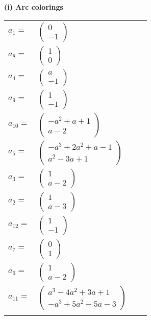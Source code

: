 \documentclass[1p]{elsarticle_modified}
\theoremstyle{definition}
\begin{document}
\flushleft \textbf{(i) Arc colorings}\\
\begin{tabular}{m{7pt} m{180pt} m{7pt} m{180pt} }
\flushright $a_{1}=$&$\begin{pmatrix}0\\-1\end{pmatrix}$ \\
\flushright $a_{8}=$&$\begin{pmatrix}1\\0\end{pmatrix}$ \\
\flushright $a_{4}=$&$\begin{pmatrix}a\\-1\end{pmatrix}$ \\
\flushright $a_{9}=$&$\begin{pmatrix}1\\-1\end{pmatrix}$ \\
\flushright $a_{10}=$&$\begin{pmatrix}- a^2+a+1\\a-2\end{pmatrix}$ \\
\flushright $a_{5}=$&$\begin{pmatrix}- a^3+2 a^2+a-1\\a^2-3 a+1\end{pmatrix}$ \\
\flushright $a_{3}=$&$\begin{pmatrix}1\\a-2\end{pmatrix}$ \\
\flushright $a_{2}=$&$\begin{pmatrix}1\\a-3\end{pmatrix}$ \\
\flushright $a_{12}=$&$\begin{pmatrix}1\\-1\end{pmatrix}$ \\
\flushright $a_{7}=$&$\begin{pmatrix}0\\1\end{pmatrix}$ \\
\flushright $a_{6}=$&$\begin{pmatrix}1\\a-2\end{pmatrix}$ \\
\flushright $a_{11}=$&$\begin{pmatrix}a^3-4 a^2+3 a+1\\- a^3+5 a^2-5 a-3\end{pmatrix}$\\&\end{tabular}
\end{document}
